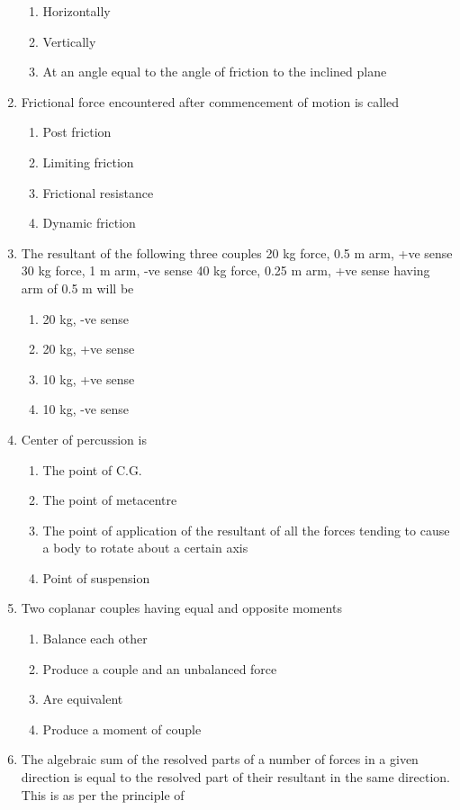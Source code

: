 \documentclass[11pt,a4paper]{article}
\begin{document}
\begin{enumerate}
\begin{enumerate}[label=\Alph*.]
\item{Horizontally}
\item{Vertically}
\item{At an angle equal to the angle of friction to the inclined plane}
\end{enumerate}
\item{Frictional force encountered after commencement of motion is called}
\begin{enumerate}[label=\Alph*.]
\item{Post friction}
\item{Limiting friction}
\item{Frictional resistance}
\item{Dynamic friction}
\end{enumerate}
\item{The resultant of the following three couples 20 kg force, 0.5 m arm, +ve sense 30 kg force, 1 m arm, -ve sense 40 kg force, 0.25 m arm, +ve sense having arm of 0.5 m will be
}
\begin{enumerate}[label=\Alph*.]
\item{20 kg, -ve sense}
\item{20 kg, +ve sense}
\item{10 kg, +ve sense}
\item{10 kg, -ve sense}
\end{enumerate}
\item{Center of percussion is}
\begin{enumerate}[label=\Alph*.]
\item{The point of C.G.}
\item{The point of metacentre}
\item{The point of application of the resultant of all the forces tending to cause a body to rotate about a certain axis}
\item{Point of suspension}
\end{enumerate}
\item{Two coplanar couples having equal and opposite moments}
\begin{enumerate}[label=\Alph*.]
\item{Balance each other}
\item{Produce a couple and an unbalanced force}
\item{Are equivalent}
\item{Produce a moment of couple}
\end{enumerate}
\item{The algebraic sum of the resolved parts of a number of forces in a given direction is equal to the resolved part of their resultant in the same direction. This is as per the principle of}

\end{enumerate}
\end{document}
